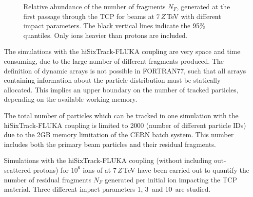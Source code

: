 \begin{figure}[b]
  \centering
  \caption{Relative abundance of the number of fragments $N_F$, generated at the first passage through the TCP for \lead beams at $7\,Z\,$TeV with different impact parameters. The black vertical lines indicate the 95\% quantiles. Only ions heavier than protons are included.}  
  \label{pic:16080501}
  \end{figure}

The simulations with the hiSixTrack-FLUKA coupling are very space and time consuming, due to the large  number of different fragments produced. The definition of dynamic arrays is not possible in FORTRAN77, such that all arrays containing information about the particle distribution must be statically allocated. This implies an upper boundary on the number of tracked particles, depending on the available working memory. 

The total number of particles which can be tracked in one simulation with the hiSixTrack-FLUKA coupling is limited to 2000 (number of different particle IDs) due to the 2GB memory limitation of the CERN batch system. This number includes both the primary beam particles and their residual fragments. 

Simulations with the hiSixTrack-FLUKA coupling (without including out-scattered protons) for $10^6$ ions of \lead at 7\,$Z$\,TeV have been carried out to quantify the number of residual fragments $N_F$ generated per initial ion impacting the TCP material. Three different impact parameters 1\mum, 3\mum\, and 10\mum\, are studied. 

